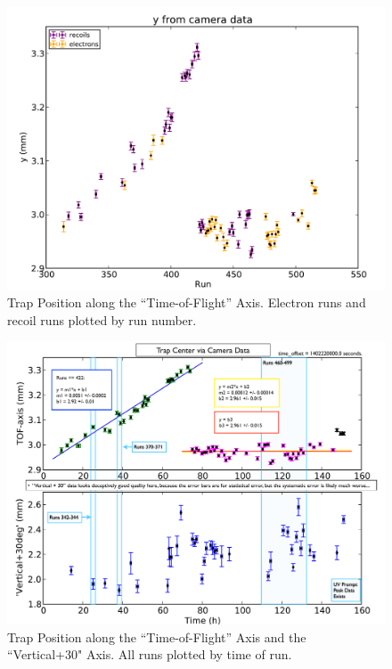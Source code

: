 \begin{figure}[h!!t]
	\centering
	\includegraphics[width=.999\linewidth]
	{Figures/y_from_camera_electron_recoil.pdf}
	\caption[Trap Position along TOF Axis]{Trap Position along the ``Time-of-Flight'' Axis.  Electron runs and recoil runs plotted by run number.  }	
	\label{fig:camera_electron_recoil}
\end{figure}

\begin{figure}[h!!t]
	\centering
	\includegraphics[width=.999\linewidth]
	{Figures/TrapPosition_FromCamera.pdf}
	\caption[Trap Position from Camera]{Trap Position along the ``Time-of-Flight'' Axis and the ``Vertical+30" Axis.  All runs plotted by time of run. }	
	\label{fig:cameraposition_by_time}
\end{figure}


